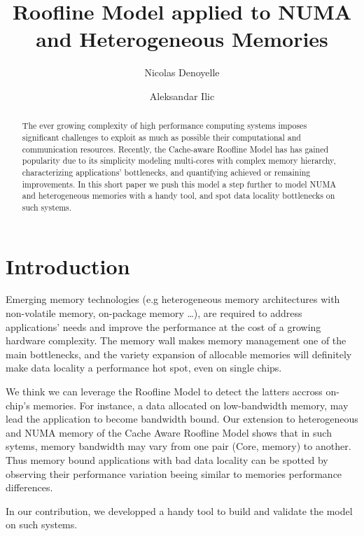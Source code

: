 \documentclass[runningheads,a4paper]{llncs}
\begin{document}
\title{Roofline Model applied to NUMA and Heterogeneous Memories}
\author{Nicolas Denoyelle \and Aleksandar Ilic}

\maketitle

\begin{abstract}
  The ever growing complexity of high performance computing systems imposes significant challenges to exploit as much as
  possible their computational and communication resources.
  Recently, the Cache-aware Roofline Model has has gained popularity due to its simplicity modeling multi-cores with complex memory
  hierarchy, characterizing applications' bottlenecks, and quantifying achieved or remaining improvements.
  In this short paper we push this model a step further to model NUMA and heterogeneous memories with a handy tool, and spot data
  locality bottlenecks on such systems.
\end{abstract}

\section{Introduction}
Emerging memory technologies (e.g heterogeneous memory architectures with non-volatile memory, on-package memory \dots), are
required to address applications' needs and improve the performance at the cost of a growing hardware complexity.
The memory wall makes memory management one of the main bottlenecks, and the variety expansion of allocable memories will
definitely make data locality a performance hot spot, even on single chips.

We think we can leverage the Roofline Model to detect the latters accross on-chip's memories.
For instance, a data allocated on low-bandwidth memory, may lead the application to become bandwidth bound.
Our extension to heterogeneous and NUMA memory of the Cache Aware Roofline Model shows that in such sytems,
memory bandwidth may vary from one pair (Core, memory) to another.
Thus memory bound applications with bad data locality can be spotted by observing their performance variation beeing similar to
memories performance differences.

In our contribution, we developped a handy tool to build and validate the model on such systems.
\end{document}

